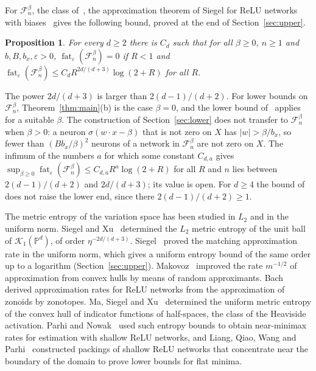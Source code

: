 \documentclass[11pt]{amsart}
\newtheorem{proposition}[theorem]{Proposition}
\theoremstyle{definition}
\theoremstyle{remark}
\numberwithin{equation}{section}
\newcommand{\cF}{\mathcal{F}}
\newcommand{\cP}{\mathbb{P}}
\newcommand{\fat}{\operatorname{fat}}
\begin{document}
For $\cF_n^{\beta}$, the class of~\cite[Theorem~3]{VSS}, the approximation theorem of Siegel for ReLU networks with biases~\cite[Theorem~2]{Siegel} gives the following bound, proved at the end of Section~\ref{sec:upper}.

\begin{proposition}\label{prop:bias}
For every $d\ge2$ there is $C_d$ such that for all $\beta\ge0$, $n\ge1$ and $b,B,b_x,\varepsilon>0$, $\fat_\varepsilon(\cF_n^{\beta})=0$ if $R<1$ and $\fat_\varepsilon(\cF_n^{\beta})\le C_dR^{2d/(d+3)}\log(2+R)$ for all $R$.
\end{proposition}

The power $2d/(d+3)$ is larger than $2(d-1)/(d+2)$. For lower bounds on $\cF_n^{\beta}$, Theorem~\ref{thm:main}(b) is the case $\beta=0$, and the lower bound of~\cite[Theorem~3]{VSS} applies for a suitable $\beta$. The construction of Section~\ref{sec:lower} does not transfer to $\cF_n^{\beta}$ when $\beta>0$: a neuron $\sigma(w\cdot x-\beta)$ that is not zero on $X$ has $|w|>\beta/b_x$, so fewer than $(Bb_x/\beta)^2$ neurons of a network in $\cF_n^{\beta}$ are not zero on $X$. The infimum of the numbers $a$ for which some constant $C_{d,a}$ gives $\sup_{\beta\ge0}\fat_\varepsilon(\cF_n^{\beta})\le C_{d,a}R^{a}\log(2+R)$ for all $R$ and $n$ lies between $2(d-1)/(d+2)$ and $2d/(d+3)$; its value is open. For $d\ge4$ the bound of~\cite[Theorem~3]{VSS} does not raise the lower end, since there $2(d-1)/(d+2)\ge1$.

The metric entropy of the variation space has been studied in $L_2$ and in the uniform norm. Siegel and Xu~\cite{SX} determined the $L_2$ metric entropy of the unit ball of $\mathcal K_1(\cP^d)$, of order $\eta^{-2d/(d+3)}$. Siegel~\cite[Theorems~2 and~3]{Siegel} proved the matching approximation rate in the uniform norm, which gives a uniform entropy bound of the same order up to a logarithm (Section~\ref{sec:upper}). Makovoz~\cite{Makovoz} improved the rate $m^{-1/2}$ of approximation from convex hulls by means of random approximants. Bach~\cite{Bach} derived approximation rates for ReLU networks from the approximation of zonoids by zonotopes. Ma, Siegel and Xu~\cite{MaSX} determined the uniform metric entropy of the convex hull of indicator functions of half-spaces, the class of the Heaviside activation. Parhi and Nowak~\cite{PN} used such entropy bounds to obtain near-minimax rates for estimation with shallow ReLU networks, and Liang, Qiao, Wang and Parhi~\cite{LQWP} constructed packings of shallow ReLU networks that concentrate near the boundary of the domain to prove lower bounds for flat minima.
\end{document}
